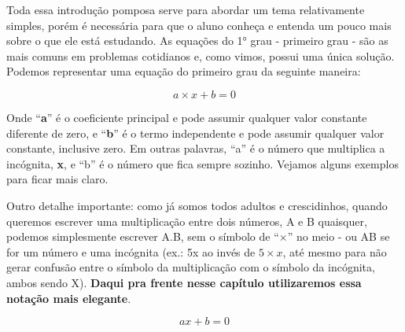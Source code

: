 Toda essa introdução pomposa serve para abordar um tema relativamente simples, porém é necessária para que o aluno conheça e entenda um pouco mais sobre o que ele está estudando. As equações do 1° grau - primeiro grau - são as mais comuns em problemas cotidianos e, como vimos, possui uma única solução. Podemos representar uma equação do primeiro grau da seguinte maneira:

\begin{equation}
    a\times x+b=0
\end{equation}

Onde ``\textbf{a}'' é o coeficiente principal e pode assumir qualquer valor constante diferente de zero, e ``\textbf{b}'' é o termo independente e pode assumir qualquer valor constante, inclusive zero. Em outras palavras, “a” é o número que multiplica a incógnita, \textbf{x}, e “b” é o número que fica sempre sozinho. Vejamos alguns exemplos para ficar mais claro.

\begin{tcolorbox}[title = IMPORTANTE]
    Outro detalhe importante: como já somos todos adultos e crescidinhos, quando queremos escrever uma multiplicação entre dois números, A e B quaisquer, podemos simplesmente escrever A.B, sem o símbolo de ``\(\times\)'' no meio - ou AB se for um número e uma incógnita (ex.: 5x ao invés de \(5\times x\), até mesmo para não gerar confusão entre o símbolo da multiplicação com o símbolo da incógnita, ambos sendo X). \textbf{Daqui pra frente nesse capítulo utilizaremos essa notação mais elegante}.

    \begin{equation}
        ax+b=0
    \end{equation}
\end{tcolorbox}


